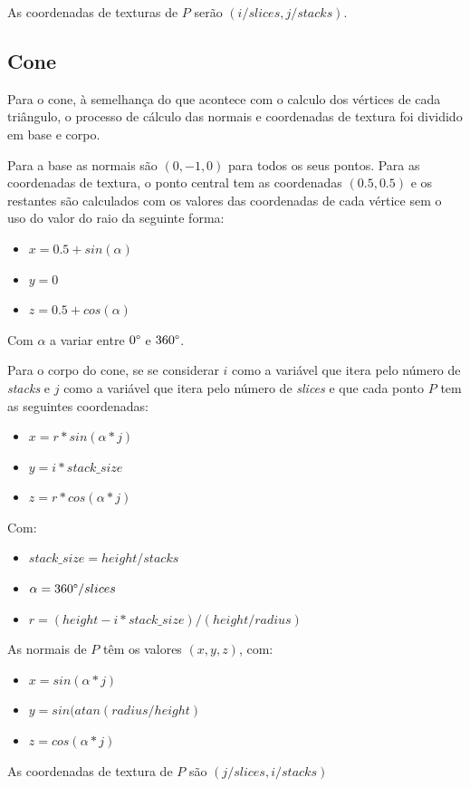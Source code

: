 \documentclass[11pt,a4paper]{report}
\begin{document}
As coordenadas de texturas de $P$ serão $(i/slices, j/stacks)$. 

\subsection{Cone}
Para o cone, à semelhança do que acontece com o calculo dos vértices de cada triângulo, o processo de cálculo das normais e coordenadas de textura foi dividido em base e corpo.

Para a base as normais são $(0,-1,0)$ para todos os seus pontos. Para as coordenadas de textura, o ponto central tem as coordenadas $(0.5,0.5)$ e os restantes são calculados com os valores das coordenadas de cada vértice sem o uso do valor do raio da seguinte forma:
\begin{itemize}
    \item $x = 0.5 + sin(\alpha)$
    \item $y = 0$
    \item $z = 0.5 + cos(\alpha)$
\end{itemize}
Com $\alpha$  a variar entre $0 \text{\textdegree}$ e $360 \text{\textdegree}$.

Para o corpo do cone, se se considerar $i$ como a variável que itera pelo número de \textit{stacks} e $j$ como a variável que itera pelo número de \textit{slices} e que cada ponto $P$ tem as seguintes coordenadas:
\begin{itemize}
    \item $x = r*sin(\alpha*j)$
    \item $y = i*stack\_size$
    \item $z = r*cos(\alpha*j)$
\end{itemize}
Com:
\begin{itemize}
    \item $stack\_size =  height/stacks$
    \item $\alpha = 360 \text{\textdegree}/slices$
    \item $r = (height - i*stack\_size)/(height/radius)$
\end{itemize} 
As normais de $P$ têm os valores $(x,y,z)$, com:
\begin{itemize}
    \item $x = sin(\alpha*j)$
    \item $y = sin(atan(radius/height)$
    \item $z = cos(\alpha*j)$
\end{itemize}

As coordenadas de textura de $P$ são $(j/slices, i/stacks)$
\end{document}
